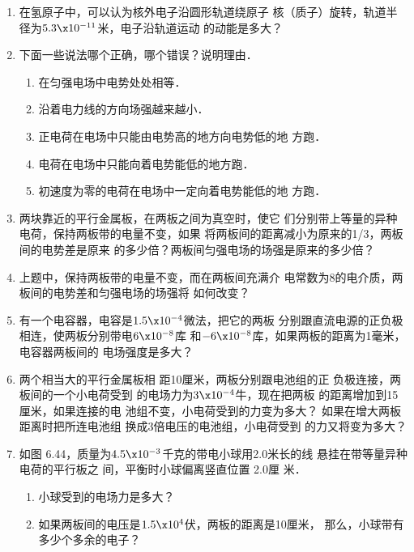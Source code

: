 \begin{enumerate}
\begin{figure}[htp]
\begin{minipage}[t]{0.48\textwidth}
\begin{tikzpicture}[>=latex]
    \end{tikzpicture}
\caption{}
\end{minipage}
\end{figure}



\item 在氢原子中，可以认为核外电子沿圆形轨道绕原子
核（质子）旋转，轨道半径为$5.3\x10^{-11}$米，电子沿轨道运动
的动能是多大？
\item 下面一些说法哪个正确，哪个错误？说明理由．
\begin{enumerate}
\item 在匀强电场中电势处处相等．
\item 沿着电力线的方向场强越来越小．
\item 正电荷在电场中只能由电势高的地方向电势低的地
方跑．
\item 电荷在电场中只能向着电势能低的地方跑．
\item 初速度为零的电荷在电场中一定向着电势能低的地
方跑．
\end{enumerate}
\item 两块靠近的平行金属板，在两板之间为真空时，使它
们分别带上等量的异种电荷，保持两板带的电量不变，如果
将两板间的距离减小为原来的1/3，两板间的电势差是原来
的多少倍？两板间匀强电场的场强是原来的多少倍？
\item 上题中，保持两板带的电量不变，而在两板间充满介
电常数为8的电介质，两板间的电势差和匀强电场的场强将
如何改变？
\item 有一个电容器，电容是$1.5\x10^{-4}$微法，把它的两板
分别跟直流电源的正负极相连，使两板分别带电$6\x10^{-8}$库
和$-6\x10^{-8}$库，如果两板的距离为1毫米，电容器两板间的
电场强度是多大？
\item 两个相当大的平行金属板相
距10厘米，两板分别跟电池组的正
负极连接，两板间的一个小电荷受到
的电场力为$3\x10^{-4}$牛，现在把两板
的距离增加到15厘米，如果连接的电
池组不变，小电荷受到的力变为多大？
如果在增大两板距离时把所连电池组
换成3倍电压的电池组，小电荷受到
的力又将变为多大？



\item 如图 6.44，质量为$4.5\x
10^{-3}$千克的带电小球用2.0米长的线
悬挂在带等量异种电荷的平行板之
间，平衡时小球偏离竖直位置 2.0厘
米．
\begin{enumerate}
	\item 小球受到的电场力是多大？
	\item 如果两板间的电压是$1.5\x10^4$伏，两板的距离是10厘米，
那么，小球带有多少个多余的电子？
\end{enumerate}
	


\end{enumerate}
